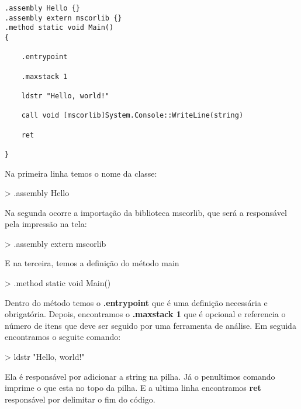 \documentclass[12pt,a4paper,twoside]{report}
\begin{document}
\begin{lstlisting}
.assembly Hello {}
.assembly extern mscorlib {}
.method static void Main()
{

	.entrypoint

	.maxstack 1

	ldstr "Hello, world!"

	call void [mscorlib]System.Console::WriteLine(string)

	ret

}
\end{lstlisting}

Na primeira linha temos o nome da classe:

\begin{terminal}
> .assembly Hello {}
\end{terminal}

Na segunda ocorre a importação da biblioteca mscorlib, que será a responsável pela impressão na tela:

\begin{terminal}
> .assembly extern mscorlib {}
\end{terminal}

E na terceira, temos a definição do método main

\begin{terminal}
> .method static void Main()
\end{terminal}

Dentro do método temos o \textbf{.entrypoint} que é uma definição necessária e obrigatória. Depois, encontramos o \textbf{.maxstack 1} que é opcional e referencia o número de itens que deve ser seguido por uma ferramenta de análise. Em seguida encontramos o seguite comando:

\begin{terminal}
> ldstr "Hello, world!"
\end{terminal}

Ela é responsável por adicionar a string na pilha. Já o penultimos comando imprime o que esta no topo da pilha. E a ultima linha encontramos \textbf{ret} responsável por delimitar o fim do código.
\end{document}
